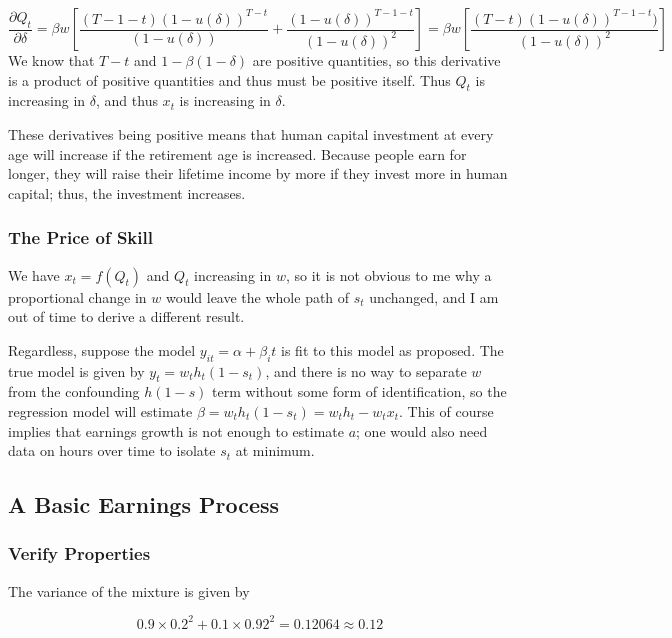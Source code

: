 \documentclass[12pt, letterpaper, parskip = full]{article}
\begin{document}
    \[ \frac{\partial Q_t}{\partial \delta} = \beta w \left[ \frac{ (T - 1 - t) (1 - u(\delta))^{T - t}}{(1 - u(\delta))}  + \frac{(1 - u(\delta))^{T - 1 - t}}{(1 - u(\delta))^{2}} \right] = \beta w \left[ \frac{(T - t) (1 - u(\delta))^{T - 1 - t})}{(1 - u(\delta))^2} \right] \]
    We know that \(T-t\) and \(1 - \beta(1 - \delta)\) are positive quantities, so this derivative is a product of positive quantities and thus must be positive itself. Thus \(Q_t\) is increasing in \(\delta\), and thus \(x_t\) is increasing in \(\delta\). 

    These derivatives being positive means that human capital investment at every age will increase if the retirement age is increased. Because people earn for longer, they will raise their lifetime income by more if they invest more in human capital; thus, the investment increases.

    \subsubsection{The Price of Skill}

    We have \(x_t = f(Q_t)\) and \(Q_t\) increasing in \(w\), so it is not obvious to me why a proportional change in \(w\) would leave the whole path of \(s_t\) unchanged, and I am out of time to derive a different result.

    Regardless, suppose the model \(y_{it} = \alpha + \beta_i t\) is fit to this model as proposed. The true model is given by \(y_t = w_t h_t (1 - s_t)\), and there is no way to separate \(w\) from the confounding \(h (1-s)\) term without some form of identification, so the regression model will estimate \(\beta = w_t h_t (1 - s_t) = w_t h_t - w_t x_t\). This of course implies that earnings growth is not enough to estimate \(a\); one would also need data on hours over time to isolate \(s_t\) at minimum.
    
    \subsection{A Basic Earnings Process}

    \subsubsection{Verify Properties}

    The variance of the mixture is given by

    \[ 0.9 \times 0.2^2 + 0.1 \times 0.92^2 = 0.12064 \approx 0.12  \]
\end{document}
